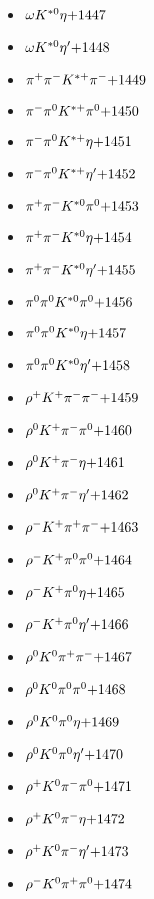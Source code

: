 \begin{multicols}{3}
\begin{itemize}
 \item $ \omega K^{*0} \eta \hfill{+1447}$
 \item $ \omega K^{*0} {\eta^{\prime}} \hfill{+1448}$
 \item $ \pi^{+} \pi^{-} K^{*+} \pi^{-} \hfill{+1449}$
 \item $ \pi^{-} \pi^{0} K^{*+} \pi^{0} \hfill{+1450}$
 \item $ \pi^{-} \pi^{0} K^{*+} \eta \hfill{+1451}$
 \item $ \pi^{-} \pi^{0} K^{*+} {\eta^{\prime}} \hfill{+1452}$
 \item $ \pi^{+} \pi^{-} K^{*0} \pi^{0} \hfill{+1453}$
 \item $ \pi^{+} \pi^{-} K^{*0} \eta \hfill{+1454}$
 \item $ \pi^{+} \pi^{-} K^{*0} {\eta^{\prime}} \hfill{+1455}$
 \item $ \pi^{0} \pi^{0} K^{*0} \pi^{0} \hfill{+1456}$
 \item $ \pi^{0} \pi^{0} K^{*0} \eta \hfill{+1457}$
 \item $ \pi^{0} \pi^{0} K^{*0} {\eta^{\prime}} \hfill{+1458}$
 \item $ \rho^{+} K^{+} \pi^{-} \pi^{-} \hfill{+1459}$
 \item $ \rho^{0} K^{+} \pi^{-} \pi^{0} \hfill{+1460}$
 \item $ \rho^{0} K^{+} \pi^{-} \eta \hfill{+1461}$
 \item $ \rho^{0} K^{+} \pi^{-} {\eta^{\prime}} \hfill{+1462}$
 \item $ \rho^{-} K^{+} \pi^{+} \pi^{-} \hfill{+1463}$
 \item $ \rho^{-} K^{+} \pi^{0} \pi^{0} \hfill{+1464}$
 \item $ \rho^{-} K^{+} \pi^{0} \eta \hfill{+1465}$
 \item $ \rho^{-} K^{+} \pi^{0} {\eta^{\prime}} \hfill{+1466}$
 \item $ \rho^{0} K^{0} \pi^{+} \pi^{-} \hfill{+1467}$
 \item $ \rho^{0} K^{0} \pi^{0} \pi^{0} \hfill{+1468}$
 \item $ \rho^{0} K^{0} \pi^{0} \eta \hfill{+1469}$
 \item $ \rho^{0} K^{0} \pi^{0} {\eta^{\prime}} \hfill{+1470}$
 \item $ \rho^{+} K^{0} \pi^{-} \pi^{0} \hfill{+1471}$
 \item $ \rho^{+} K^{0} \pi^{-} \eta \hfill{+1472}$
 \item $ \rho^{+} K^{0} \pi^{-} {\eta^{\prime}} \hfill{+1473}$
 \item $ \rho^{-} K^{0} \pi^{+} \pi^{0} \hfill{+1474}$

\end{itemize}
\end{multicols}
